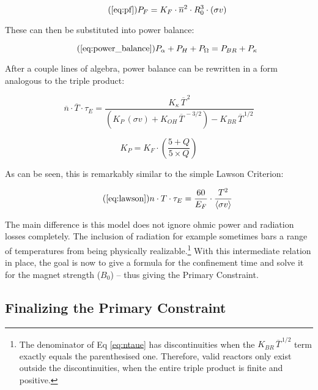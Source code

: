 \begin{equation}
	\tag{\ref{eq:pf}}
	P_F = K_F \cdot \overline{n}^2 \cdot R_0^3  \cdot (\sigma v)
\end{equation}

These can then be substituted into power balance:

\begin{equation}
	\tag{\ref{eq:power_balance}}
	P_\alpha + P_H + P_\Omega = P_{BR} + P_\kappa
\end{equation}

After a couple lines of algebra, power balance can be rewritten in a form analogous to the triple product:

\begin{equation}
	\label{eq:ntaue}
	 \overline{n}  \cdot \overline{T} \cdot \tau_E = \frac{ K_\kappa \, \overline{T}^{\,2} }{ \left( K_P \, (\sigma v) +  K_{OH} \, \overline{T}^{  \,-3/2 } \right) - K_{BR} \, \overline{T}^{  \,1/2 } }
\end{equation}

\begin{equation}
	K_P = K_F \cdot \left( \frac{5 + Q}{5 \times Q} \right)
\end{equation}

As can be seen, this is remarkably similar to the simple Lawson Criterion:

\begin{equation}
	\tag{\ref{eq:lawson}}
	n \cdot T \cdot \tau_E = \frac{ 60 }{ E_F } \cdot \frac{ T ^ 2 }{ \langle \sigma v \rangle }
\end{equation} 

The main difference is this model does not ignore ohmic power and radiation losses completely. The inclusion of radiation for example sometimes bars a range of temperatures from being physically realizable.\footnote{ The denominator of Eq \ref{eq:ntaue} has discontinuities when the $K_{BR} \, \overline{T}^{  \,1/2 }$ term exactly equals the parenthesised one. Therefore, valid reactors only exist outside the discontinuities, when the entire triple product is finite and positive. } With this intermediate relation in place, the goal is now to give a formula for the confinement time and solve it for the magnet strength ($B_0$) -- thus giving the Primary Constraint.

\subsection{Finalizing the Primary Constraint}

